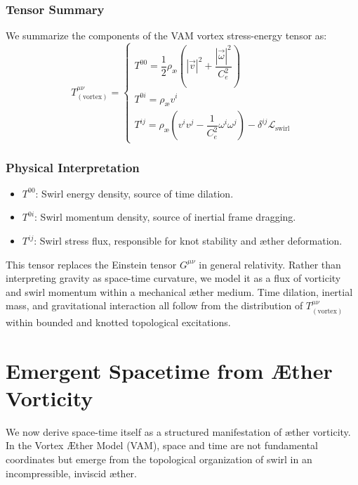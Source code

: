 \subsubsection*{Tensor Summary}

We summarize the components of the VAM vortex stress-energy tensor as:
\begin{equation}
    \boxed{
        T^{\mu\nu}_{(\text{vortex})} =
        \begin{cases}
            T^{00} = \dfrac{1}{2} \rho_\text{\ae} \left( |\vec{v}|^2 + \dfrac{|\vec{\omega}|^2}{C_e^2} \right) \\[6pt]
            T^{0i} = \rho_\text{\ae} v^i \\[6pt]
            T^{ij} = \rho_\text{\ae} \left( v^i v^j - \dfrac{1}{C_e^2} \omega^i \omega^j \right) - \delta^{ij} \mathcal{L}_{\text{swirl}}
        \end{cases}
    }
\end{equation}

\subsubsection*{Physical Interpretation}

\begin{itemize}[leftmargin=1.5em]
    \item \( T^{00} \): Swirl energy density, source of time dilation.
    \item \( T^{0i} \): Swirl momentum density, source of inertial frame dragging.
    \item \( T^{ij} \): Swirl stress flux, responsible for knot stability and æther deformation.
\end{itemize}

This tensor replaces the Einstein tensor \( G^{\mu\nu} \) in general relativity. Rather than interpreting gravity as space-time curvature, we model it as a flux of vorticity and swirl momentum within a mechanical æther medium. Time dilation, inertial mass, and gravitational interaction all follow from the distribution of \( T^{\mu\nu}_{(\text{vortex})} \) within bounded and knotted topological excitations.


\section{Emergent Spacetime from Æther Vorticity}
\label{sec:spacetime_emergence}

We now derive space-time itself as a structured manifestation of æther vorticity. In the Vortex \AE ther Model (VAM), space and time are not fundamental coordinates but emerge from the topological organization of swirl in an incompressible, inviscid æther.

